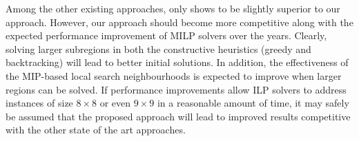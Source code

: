 \documentclass[preprint,12pt]{elsarticle}
\begin{document}
Among the other existing approaches, only \cite{WVV12} shows to be slightly superior to our approach.
However, our approach should become more competitive along with the expected performance improvement of MILP solvers over the years.
Clearly, solving larger subregions in both the constructive heuristics (greedy and backtracking) will lead to better initial solutions. 
In addition, the effectiveness of the MIP-based local search neighbourhoods is expected to improve when larger regions can be solved.
If performance improvements allow ILP solvers to address instances of size $8 \times 8$ or even $9 \times 9$ in a reasonable amount of time, it may safely be assumed that the proposed approach will lead to improved results competitive with the other state of the art approaches.

\end{document}
